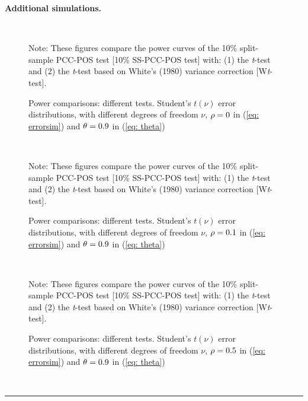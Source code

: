 \documentclass[harvard,11pt]{article}
\newenvironment{proof}[1][Proof]{\textbf{#1.} }{\  \rule{0.5em}{0.5em}}
\begin{document}
\begin{proof}[Additional simulations]

\begin{figure}[tbph]
\caption{Power comparisons: different tests. Student's $t(\nu)$ error distributions, with
different degrees of freedom $\nu$, $\protect\rho=0$ in (\protect\ref{eq: errorsim}) and $\protect%
\theta =0.9$ in (\protect\ref{eq: theta})}
\begin{center}
 \\[0pt]
\end{center}
\doublespacing
Note: These figures compare the power curves of the 10\% split-sample PCC-POS test
[10\% SS-PCC-POS test] with: (1) the \textit{t}-test and (2) the \textit{t}-test based
on White's (1980) variance correction [W\textit{t}-test]. 
\label{fig: c21}
\end{figure}
\FloatBarrier

\begin{figure}[tbph]
\caption{Power comparisons: different tests. Student's $t(\nu)$ error distributions, with
different degrees of freedom $\nu$, $\protect\rho=0.1$ in (\protect\ref{eq: errorsim}) and $\protect%
\theta =0.9$ in (\protect\ref{eq: theta})}
\begin{center}
 \\[0pt]
\end{center}
\doublespacing
Note: These figures compare the power curves of the 10\% split-sample PCC-POS test
[10\% SS-PCC-POS test] with: (1) the \textit{t}-test and (2) the \textit{t}-test based
on White's (1980) variance correction [W\textit{t}-test]. 
\label{fig: c22}
\end{figure}
\FloatBarrier

\begin{figure}[tbph]
\caption{Power comparisons: different tests. Student's $t(\nu)$ error distributions, with
different degrees of freedom $\nu$, $\protect\rho=0.5$ in (\protect\ref{eq: errorsim}) and $\protect%
\theta =0.9$ in (\protect\ref{eq: theta})}
\begin{center}
 \\[0pt]
\end{center}
\doublespacing
Note: These figures compare the power curves of the 10\% split-sample PCC-POS test
[10\% SS-PCC-POS test] with: (1) the \textit{t}-test and (2) the \textit{t}-test based
on White's (1980) variance correction [W\textit{t}-test].  
\label{fig: c23}
\end{figure}
\FloatBarrier


\end{proof}
\end{document}
